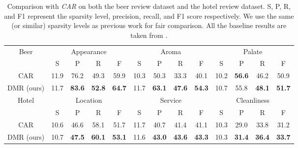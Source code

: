 \documentclass[letterpaper]{article} %
\begin{document}
\begin{table*}[]
    \centering
\vspace{0.5cm}
\small
\begin{tabular}{c|cccc|cccc|cccc}
\hline%
\multicolumn{1}{c|}{\multirow{2}{*}{Beer}} & \multicolumn{4}{c|}{Appearance}                               & \multicolumn{4}{c|}{Aroma}                                    & \multicolumn{4}{c}{Palate}                                   \\
\multicolumn{1}{c|}{}                      & S    & P             & R             & \multicolumn{1}{c|}{F} & S    & P             & R             & \multicolumn{1}{c|}{F} & S    & P             & R             & \multicolumn{1}{c}{F} \\ \hline
CAR                                        & 11.9 & 76.2          & 49.3          & 59.9                   & 10.3 & 50.3          & 33.3          & 40.1                   & 10.2 & \textbf{56.6} & 46.2          & 50.9                   \\
DMR (ours)                                        & 11.7 & \textbf{83.6} & \textbf{52.8} & \textbf{64.7}          & 11.7 & \textbf{63.1}          & \textbf{47.6}          & \textbf{54.3}                   & 10.7 & 55.8          & \textbf{48.1} & \textbf{51.7}          \\
\hline%
\multirow{2}{*}{Hotel} & \multicolumn{4}{c|}{Location}                        & \multicolumn{4}{c|}{Service}                         & \multicolumn{4}{c}{Cleanliness}                      \\
                      & S    & P             & R             & F             & S    & P             & R             & F             & S    & P             & R             & F             \\ \hline
CAR                   & 10.6 & 46.6          & 58.1          & 51.7          & 11.7 & 40.7          & 41.4          & 41.1          & 10.3 & 29.0          & 33.8          & 31.2          \\
DMR (ours)                   & 10.7 & \textbf{47.5} & \textbf{60.1} & \textbf{53.1} & 11.6 & \textbf{43.0} & \textbf{43.6} & \textbf{43.3} & 10.3 & \textbf{31.4} & \textbf{36.4} & \textbf{33.7} \\\hline
\end{tabular}

\caption{\normalsize Comparison with \emph{CAR} on both the beer review dataset and the hotel review dataset. S, P, R, and F1 represent the sparsity level, precision, recall, and F1 score respectively. We use the same (or similar) sparsity levels as previous work for fair comparison. All the baseline results are taken from \cite{chang2019game}.}
    \label{tab:table_game}
\end{table*}
\end{document}
